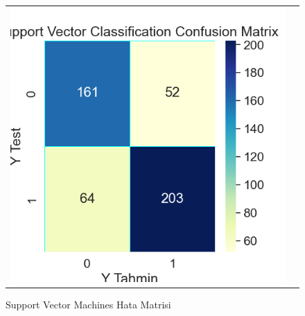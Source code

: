 \documentclass[conference]{IEEEtran}
\begin{document}
\begin{figure}[!h]
	\centering
	\begin{center}
		\begin{tabular}{cc}
			\includegraphics[scale=0.45]{pictures/pic_11.png}&
		\end{tabular}
	\end{center}
	\caption{Support Vector Machines Hata Matrisi}
	\label{fig:11}
\end{figure}
\end{document}
